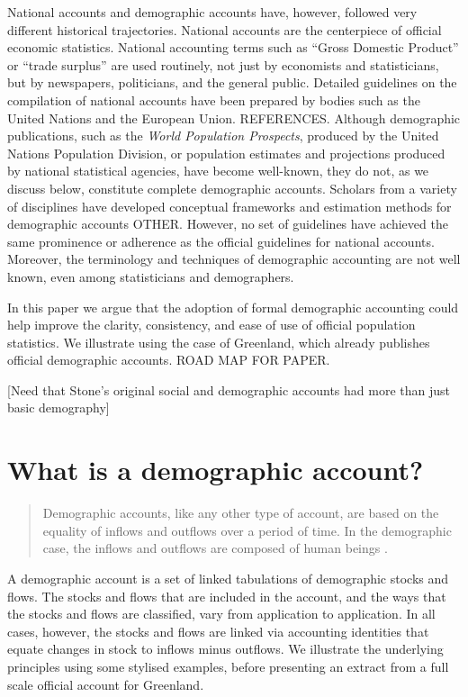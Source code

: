 \documentclass[USenglish]{article}
\begin{document}
National accounts and demographic accounts have, however, followed very different historical trajectories. National accounts are the centerpiece of official economic statistics. National accounting terms such as ``Gross Domestic Product'' or ``trade surplus'' are used routinely, not just by economists and statisticians, but by newspapers, politicians, and the general public. Detailed guidelines on the compilation of national accounts have been prepared by bodies such as the United Nations and the European Union. REFERENCES. Although demographic publications, such as the \emph{World Population Prospects}, produced by the United Nations Population Division, or population estimates and projections produced by national statistical agencies, have become well-known, they do not, as we discuss below, constitute complete demographic accounts. Scholars from a variety of disciplines have developed conceptual frameworks and estimation methods for demographic accounts \citep{rees1977spatial,rees1986data, rees1979regional,rees1985choices,rees2012ethnic,bryant2013bayesian, wheldon2013reconstructing,willekens2011population} OTHER. However, no set of guidelines have achieved the same prominence or adherence as the official guidelines for national accounts.  Moreover, the terminology and techniques of demographic accounting are not well known, even among statisticians and demographers.

In this paper we argue that the adoption of formal demographic accounting could help improve the clarity, consistency, and ease of use of official population statistics. We illustrate using the case of Greenland, which already publishes official demographic accounts. ROAD MAP FOR PAPER.

[Need that Stone's original social and demographic accounts had more than just basic demography]


\section{What is a demographic account?}

\begin{quote}
Demographic accounts, like any other type of account, are based on the equality of inflows and outflows over a period of time. In the demographic case, the inflows and outflows are composed of human beings \citep[][p. 26]{stone1984accounts}.
\end{quote}

A demographic account is a set of linked tabulations of demographic stocks and flows. The stocks and flows that are included in the account, and the ways that the stocks and flows are classified, vary from application to application. In all cases, however, the stocks and flows are linked via accounting identities that equate changes in stock to inflows minus outflows. We illustrate the underlying principles using some stylised examples, before presenting an extract from a full scale official account for Greenland.
\end{document}
